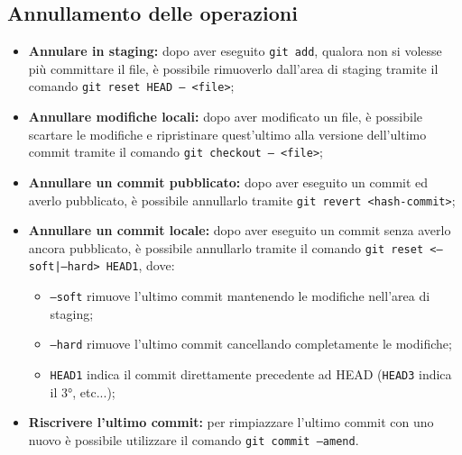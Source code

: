 \documentclass[12pt]{article}
\begin{document}
    \subsection{Annullamento delle operazioni}
    \begin{itemize}
      \item \textbf{Annulare in staging:} dopo aver eseguito \texttt{git add}, qualora non si volesse più committare il file, è possibile rimuoverlo dall'area di staging tramite il comando \texttt{git reset HEAD -- <file>};
      \item \textbf{Annullare modifiche locali:} dopo aver modificato un file, è possibile scartare le modifiche e ripristinare quest'ultimo alla versione dell'ultimo commit tramite il comando \texttt{git checkout -- <file>};
      \item \textbf{Annullare un commit pubblicato:} dopo aver eseguito un commit ed averlo pubblicato, è possibile annullarlo tramite \texttt{git revert <hash-commit>};
      \item \textbf{Annullare un commit locale:} dopo aver eseguito un commit senza averlo ancora pubblicato, è possibile annullarlo tramite il comando \texttt{git reset <--soft|--hard> HEAD\raisebox{-0.5ex}{\~{}}1}, dove:
        \begin{itemize}
          \item \texttt{--soft} rimuove l'ultimo commit mantenendo le modifiche nell'area di staging;
          \item \texttt{--hard} rimuove l'ultimo commit cancellando completamente le modifiche;
          \item \texttt{HEAD\raisebox{-0.5ex}{\~{}}1} indica il commit direttamente precedente ad HEAD (\texttt{HEAD\raisebox{-0.5ex}{\~{}}3} indica il 3°, etc...); 
        \end{itemize}
      \item \textbf{Riscrivere l'ultimo commit:} per rimpiazzare l'ultimo commit con uno nuovo è possibile utilizzare il comando \texttt{git commit --amend}.
    \end{itemize}
\end{document}
